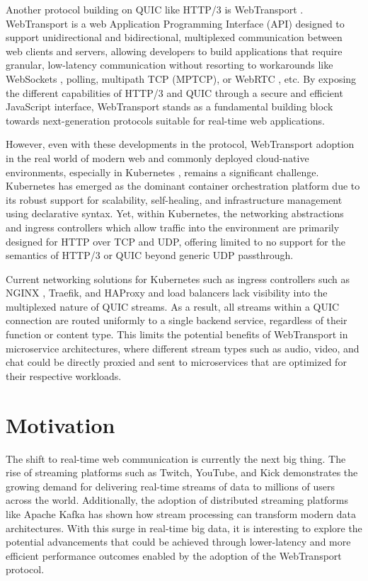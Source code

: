 Another protocol building on QUIC like HTTP/3 is WebTransport \cite{webtransport-draft}. WebTransport \cite{webtransport-mdn} is a web Application Programming Interface (API) designed to support unidirectional and bidirectional, multiplexed communication between web clients and servers, allowing developers to build applications that require granular, low-latency communication without resorting to workarounds like WebSockets \cite{rfc6455}, polling, multipath TCP (MPTCP), or WebRTC \cite{webrtc}, etc. By exposing the different capabilities of HTTP/3 \cite{marx2021-http3} and QUIC through a secure and efficient JavaScript interface, WebTransport stands as a fundamental building block towards next-generation protocols suitable for real-time web applications.

However, even with these developments in the protocol, WebTransport adoption in the real world of modern web and commonly deployed cloud-native environments, especially in Kubernetes \cite{kubernetes-docs}, remains a significant challenge. Kubernetes has emerged as the dominant container orchestration platform due to its robust support for scalability, self-healing, and infrastructure management using declarative syntax. Yet, within Kubernetes, the networking abstractions and ingress controllers which allow traffic into the environment are primarily designed for HTTP over TCP and UDP, offering limited to no support for the semantics of HTTP/3 or QUIC beyond generic UDP passthrough.

Current networking solutions for Kubernetes such as ingress controllers such as NGINX \cite{nginx-ingress-docs}, Traefik, and HAProxy \cite{haproxy-k8s-docs} and load balancers lack visibility into the multiplexed nature of QUIC streams. As a result, all streams within a QUIC connection are routed uniformly to a single backend service, regardless of their function or content type. This limits the potential benefits of WebTransport in microservice architectures, where different stream types such as audio, video, and chat could be directly proxied and sent to microservices that are optimized for their respective workloads.




\section{Motivation}

The shift to real-time web communication is currently the next big thing. The rise of streaming platforms such as Twitch, YouTube, and Kick demonstrates the growing demand for delivering real-time streams of data to millions of users across the world. Additionally, the adoption of distributed streaming platforms like Apache Kafka \cite{kreps2011} has shown how stream processing can transform modern data architectures. With this surge in real-time big data, it is interesting to explore the potential advancements that could be achieved through lower-latency and more efficient performance outcomes enabled by the adoption of the WebTransport protocol.


